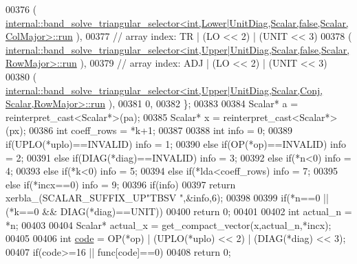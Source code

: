 \begin{DoxyCode}
00376     (
      \hyperlink{structinternal_1_1band__solve__triangular__selector}{internal::band\_solve\_triangular\_selector<int,Lower|UnitDiag,Scalar,false,Scalar,ColMajor>::run}
      ),
00377     \textcolor{comment}{// array index: TR    | (LO << 2) | (UNIT  << 3)}
00378     (
      \hyperlink{structinternal_1_1band__solve__triangular__selector}{internal::band\_solve\_triangular\_selector<int,Upper|UnitDiag,Scalar,false,Scalar,RowMajor>::run}
      ),
00379     \textcolor{comment}{// array index: ADJ   | (LO << 2) | (UNIT  << 3)}
00380     (
      \hyperlink{structinternal_1_1band__solve__triangular__selector}{internal::band\_solve\_triangular\_selector<int,Upper|UnitDiag,Scalar,Conj, Scalar,RowMajor>::run}
      ),
00381     0,
00382   \};
00383 
00384   Scalar* a = \textcolor{keyword}{reinterpret\_cast<}Scalar*\textcolor{keyword}{>}(pa);
00385   Scalar* x = \textcolor{keyword}{reinterpret\_cast<}Scalar*\textcolor{keyword}{>}(px);
00386   \textcolor{keywordtype}{int} coeff\_rows = *k+1;
00387 
00388   \textcolor{keywordtype}{int} info = 0;
00389        \textcolor{keywordflow}{if}(UPLO(*uplo)==INVALID)                                       info = 1;
00390   \textcolor{keywordflow}{else} \textcolor{keywordflow}{if}(OP(*op)==INVALID)                                           info = 2;
00391   \textcolor{keywordflow}{else} \textcolor{keywordflow}{if}(DIAG(*diag)==INVALID)                                       info = 3;
00392   \textcolor{keywordflow}{else} \textcolor{keywordflow}{if}(*n<0)                                                       info = 4;
00393   \textcolor{keywordflow}{else} \textcolor{keywordflow}{if}(*k<0)                                                       info = 5;
00394   \textcolor{keywordflow}{else} \textcolor{keywordflow}{if}(*lda<coeff\_rows)                                            info = 7;
00395   \textcolor{keywordflow}{else} \textcolor{keywordflow}{if}(*incx==0)                                                   info = 9;
00396   \textcolor{keywordflow}{if}(info)
00397     \textcolor{keywordflow}{return} xerbla\_(SCALAR\_SUFFIX\_UP\textcolor{stringliteral}{"TBSV "},&info,6);
00398 
00399   \textcolor{keywordflow}{if}(*n==0 || (*k==0 && DIAG(*diag)==UNIT))
00400     \textcolor{keywordflow}{return} 0;
00401 
00402   \textcolor{keywordtype}{int} actual\_n = *n;
00403 
00404   Scalar* actual\_x = get\_compact\_vector(x,actual\_n,*incx);
00405 
00406   \textcolor{keywordtype}{int} \hyperlink{structcode}{code} = OP(*op) | (UPLO(*uplo) << 2) | (DIAG(*diag) << 3);
00407   \textcolor{keywordflow}{if}(code>=16 || func[code]==0)
00408     \textcolor{keywordflow}{return} 0;

\end{DoxyCode}
